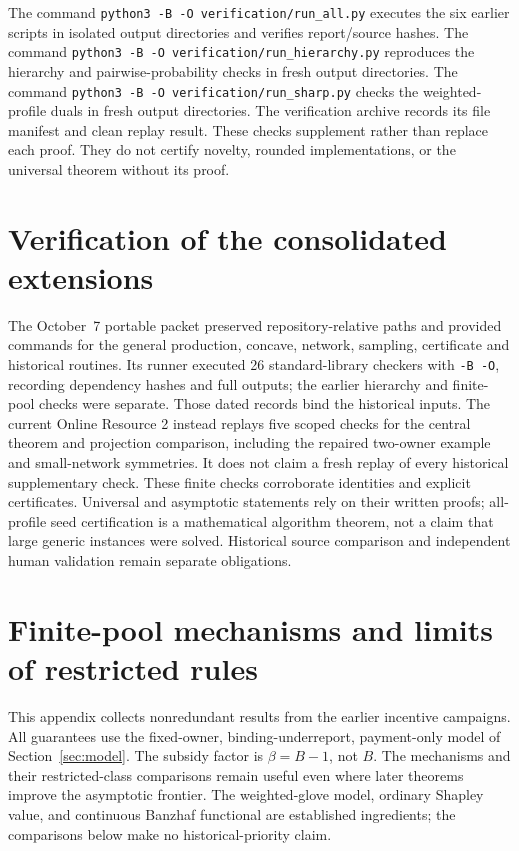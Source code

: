 \documentclass[11pt]{article}
\theoremstyle{definition}\newtheorem{definition}[theorem]{Definition}
\theoremstyle{remark}\newtheorem{remark}[theorem]{Remark}
\begin{document}
The command \texttt{python3 -B -O verification/run\_all.py} executes the six
earlier scripts in isolated output directories and verifies report/source hashes.
The command \nolinkurl{python3 -B -O verification/run_hierarchy.py} reproduces
the hierarchy and pairwise-probability checks in fresh output directories.
The command \texttt{python3 -B -O verification/run\_sharp.py} checks the
weighted-profile duals in fresh output directories.
The verification archive records its file manifest and clean replay result.
These checks supplement rather than replace each proof. They do not certify
novelty, rounded implementations, or the universal theorem without its proof.


\section{Verification of the consolidated extensions}\label{app:consolidated-checks}
The October~7 portable packet preserved repository-relative paths and
provided commands for the general production, concave, network, sampling,
certificate and historical routines. Its runner executed 26 standard-library
checkers with \texttt{-B -O}, recording dependency hashes and full outputs;
the earlier hierarchy and finite-pool checks were separate. Those dated
records bind the historical inputs. The current Online Resource 2 instead
replays five scoped checks for the central theorem and projection comparison,
including the repaired two-owner example and small-network symmetries. It
does not claim a fresh replay of every historical supplementary check.
These finite checks corroborate identities and explicit certificates.
Universal and asymptotic statements rely on their written proofs; all-profile
seed certification is a mathematical algorithm theorem, not a claim that
large generic instances were solved. Historical source comparison and
independent human validation remain separate obligations.

\section{Finite-pool mechanisms and limits of restricted rules}\label{hist:appendix}
This appendix collects nonredundant results from the earlier incentive
campaigns. All guarantees use the fixed-owner, binding-underreport,
payment-only model of Section~\ref{sec:model}. The subsidy factor is
$\beta=B-1$, not $B$. The mechanisms and their restricted-class comparisons
remain useful even where later theorems improve the asymptotic frontier.
The weighted-glove model, ordinary Shapley value, and continuous Banzhaf
functional are established ingredients; the comparisons below make no
historical-priority claim.
\end{document}
